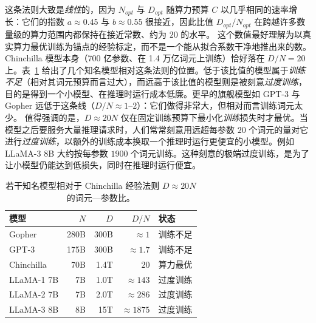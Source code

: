 这条法则大致是\emph{线性}的，因为 $N_{opt}$ 与 $D_{opt}$ 随算力预算 $C$ 以几乎相同的速率增长：它们的指数 $a \approx 0.45$ 与 $b \approx 0.55$ 很接近，因此比值 $D_{opt}/N_{opt}$ 在跨越许多数量级的算力范围内都保持在接近常数、约为 $20$ 的水平。
这个数值最好理解为以真实算力最优训练为锚点的经验标定，而不是一个能从拟合系数干净地推出来的数。Chinchilla 模型本身（700 亿参数、在 1.4 万亿词元上训练）恰好落在 $D/N = 20$ 上。表~\ref{tab:token-param} 给出了几个知名模型相对这条法则的位置。低于该比值的模型属于\emph{训练不足}（相对其词元预算而言过大），而远高于该比值的模型则是被刻意\emph{过度训练}，目的是得到一个小模型、在推理时运行成本低廉。更早的旗舰模型如 GPT-3 与 Gopher 远低于这条线（$D/N \approx 1$–$2$）：它们做得非常大，但相对而言训练词元太少。
值得强调的是，$D \approx 20N$ 仅在固定训练预算下最小化\emph{训练}损失时才最优。当模型之后要服务大量推理请求时，人们常常刻意用远超每参数 $20$ 个词元的量对它进行\emph{过度训练}，以额外的训练成本换取一个推理时运行更便宜的小模型。例如 LLaMA-3 8B 大约按每参数 $1900$ 个词元训练。这种刻意的极端过度训练，是为了让小模型仍能达到低损失，同时在推理时运行便宜。

\begin{table}
    \centering
    \begin{tabular}{lrrrl}
        \toprule
        模型 & $N$ & $D$ & $D/N$ & 状态 \\
        \midrule
        Gopher \citep{rae2021scaling}            & 280B & 300B & $\approx 1$    & 训练不足 \\
        GPT-3 \citep{brown2020language}          & 175B & 300B & $\approx 1.7$  & 训练不足 \\
        Chinchilla \citep{10.5555/3600270.3602446} & 70B  & 1.4T & $20$           & 算力最优 \\
        LLaMA-1 7B \citep{touvron2023llama1}     & 7B   & 1.0T & $\approx 143$  & 过度训练 \\
        LLaMA-2 7B \citep{touvron2023llama}      & 7B   & 2.0T & $\approx 286$  & 过度训练 \\
        LLaMA-3 8B \citep{grattafiori2024llama3herdmodels} & 8B   & 15T  & $\approx 1875$ & 过度训练 \\
        \bottomrule
    \end{tabular}
    \caption{若干知名模型相对于 Chinchilla 经验法则 $D \approx 20N$ 的词元—参数比。}
    \label{tab:token-param}
\end{table}



